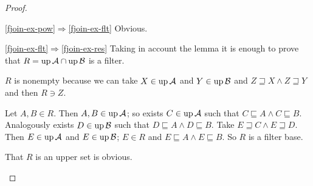 \begin{proof}
~
\begin{widedisorder}
\item[\ref{fjoin-ex-pow}$\Rightarrow$\ref{fjoin-ex-flt}]
  Obvious.
\item[\ref{fjoin-ex-flt}$\Rightarrow$\ref{fjoin-ex-res}]
  Taking in account the lemma it is enough to prove that $R = \operatorname{up}
  \mathcal{A} \cap \operatorname{up} \mathcal{B}$ is a filter.

  $R$ is nonempty because we can take $X \in \operatorname{up} \mathcal{A}$ and $Y \in
  \operatorname{up} \mathcal{B}$ and $Z\sqsupseteq X\land Z\sqsupseteq Y$ and then $R \ni Z$.

  Let $A, B \in R$. Then $A, B \in \operatorname{up} \mathcal{A}$; so exists $C \in
  \operatorname{up} \mathcal{A}$ such that $C \sqsubseteq A \land C \sqsubseteq B$.
  Analogously exists $D \in \operatorname{up} \mathcal{B}$ such that $D \sqsubseteq A \land
  D \sqsubseteq B$. Take $E\sqsupseteq C\land E\sqsupseteq D$. Then $E \in \operatorname{up}
  \mathcal{A}$ and $E \in \operatorname{up} \mathcal{B}$; $E \in R$ and $E \sqsubseteq A \land
  E \sqsubseteq B$. So $R$ is a filter base.

  That $R$ is an upper set is obvious.
\end{widedisorder}
\end{proof}

